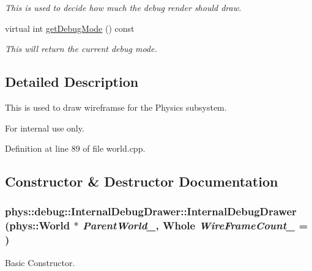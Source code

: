 \begin{DoxyCompactItemize}
\begin{DoxyCompactList}\small\item\em This is used to decide how much the debug render should draw. \item\end{DoxyCompactList}\item 
virtual int \hyperlink{classphys_1_1debug_1_1InternalDebugDrawer_aba329861569d741e970ce5aafb668e84}{getDebugMode} () const 
\begin{DoxyCompactList}\small\item\em This will return the current debug mode. \item\end{DoxyCompactList}\end{DoxyCompactItemize}


\subsection{Detailed Description}
This is used to draw wireframse for the Physics subsystem. \begin{DoxyInternal}{For internal use only.}
\end{DoxyInternal}


Definition at line 89 of file world.cpp.



\subsection{Constructor \& Destructor Documentation}
\hypertarget{classphys_1_1debug_1_1InternalDebugDrawer_a0e701e00e1080fdadfcf35e9051789a3}{
\subsubsection[{InternalDebugDrawer}]{\setlength{\rightskip}{0pt plus 5cm}phys::debug::InternalDebugDrawer::InternalDebugDrawer ({\bf phys::World} $\ast$ {\em ParentWorld\_\-}, \/  {\bf Whole} {\em WireFrameCount\_\-} = {})}}
\label{db/d27/classphys_1_1debug_1_1InternalDebugDrawer_a0e701e00e1080fdadfcf35e9051789a3}


Basic Constructor. 

